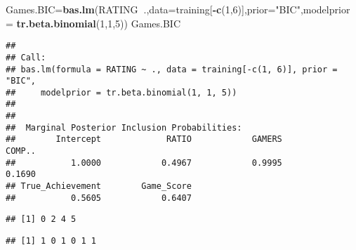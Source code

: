 \documentclass[
]{article}
\newenvironment{Shaded}{\begin{snugshade}}{\end{snugshade}}
\newcommand{\DataTypeTok}[1]{\textcolor[rgb]{0.13,0.29,0.53}{#1}}
\newcommand{\DecValTok}[1]{\textcolor[rgb]{0.00,0.00,0.81}{#1}}
\newcommand{\KeywordTok}[1]{\textcolor[rgb]{0.13,0.29,0.53}{\textbf{#1}}}
\newcommand{\NormalTok}[1]{#1}
\newcommand{\OperatorTok}[1]{\textcolor[rgb]{0.81,0.36,0.00}{\textbf{#1}}}
\newcommand{\StringTok}[1]{\textcolor[rgb]{0.31,0.60,0.02}{#1}}
\begin{document}
\begin{Shaded}
\begin{Highlighting}[]
\NormalTok{Games.BIC=}\KeywordTok{bas.lm}\NormalTok{(RATING}\OperatorTok{~}\NormalTok{.,}\DataTypeTok{data=}\NormalTok{training[}\OperatorTok{-}\KeywordTok{c}\NormalTok{(}\DecValTok{1}\NormalTok{,}\DecValTok{6}\NormalTok{)],}\DataTypeTok{prior=}\StringTok{"BIC"}\NormalTok{,}\DataTypeTok{modelprior =} \KeywordTok{tr.beta.binomial}\NormalTok{(}\DecValTok{1}\NormalTok{,}\DecValTok{1}\NormalTok{,}\DecValTok{5}\NormalTok{))}
\NormalTok{Games.BIC}
\end{Highlighting}
\end{Shaded}

\begin{verbatim}
## 
## Call:
## bas.lm(formula = RATING ~ ., data = training[-c(1, 6)], prior = "BIC", 
##     modelprior = tr.beta.binomial(1, 1, 5))
## 
## 
##  Marginal Posterior Inclusion Probabilities: 
##        Intercept             RATIO            GAMERS            COMP..  
##           1.0000            0.4967            0.9995            0.1690  
## True_Achievement        Game_Score  
##           0.5605            0.6407
\end{verbatim}

\begin{Shaded}
\end{Shaded}

\begin{verbatim}
## [1] 0 2 4 5
\end{verbatim}

\begin{Shaded}
\end{Shaded}

\begin{verbatim}
## [1] 1 0 1 0 1 1
\end{verbatim}
\end{document}
